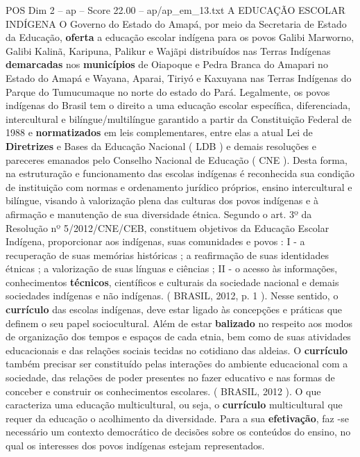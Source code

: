 \begin{textsample}{POS Dim 2 – ap – Score 22.00 – ap/ap\_em\_13.txt}  \label{ex:f2_pos_147}
A EDUCAÇÃO ESCOLAR INDÍGENA O Governo do Estado do Amapá, por meio da Secretaria de Estado da Educação, \textbf{oferta} a educação escolar indígena para os povos Galibi Marworno, Galibi Kalinã, Karipuna, Palikur e Wajãpi distribuídos nas Terras Indígenas \textbf{demarcadas} nos \textbf{municípios} de Oiapoque e Pedra Branca do Amapari no Estado do Amapá e Wayana, Aparai, Tiriyó e Kaxuyana nas Terras Indígenas do Parque do Tumucumaque no norte do estado do Pará.
Legalmente, os povos indígenas do Brasil tem o direito a uma educação escolar específica, diferenciada, intercultural e bilíngue/multilíngue garantido a partir da Constituição Federal de 1988 e \textbf{normatizados} em leis complementares, entre elas a atual Lei de \textbf{Diretrizes} e Bases da Educação Nacional ( LDB ) e demais resoluções e pareceres emanados pelo Conselho Nacional de Educação ( CNE ).
Desta forma, na estruturação e funcionamento das escolas indígenas é reconhecida sua condição de instituição com normas e ordenamento jurídico próprios, ensino intercultural e bilíngue, visando à valorização plena das culturas dos povos indígenas e à afirmação e manutenção de sua diversidade étnica.
Segundo o art. 3º da Resolução nº 5/2012/CNE/CEB, constituem objetivos da Educação Escolar Indígena, proporcionar aos indígenas, suas comunidades e povos : I - a recuperação de suas memórias históricas ; a reafirmação de suas identidades étnicas ; a valorização de suas línguas e ciências ; II - o acesso às informações, conhecimentos \textbf{técnicos}, científicos e culturais da sociedade nacional e demais sociedades indígenas e não indígenas. ( BRASIL, 2012, p. 1 ).
Nesse sentido, o \textbf{currículo} das escolas indígenas, deve estar ligado às concepções e práticas que definem o seu papel sociocultural.
Além de estar \textbf{balizado} no respeito aos modos de organização dos tempos e espaços de cada etnia, bem como de suas atividades educacionais e das relações sociais tecidas no cotidiano das aldeias.
O \textbf{currículo} também precisar ser constituído pelas interações do ambiente educacional com a sociedade, das relações de poder presentes no fazer educativo e nas formas de conceber e construir os conhecimentos escolares. ( BRASIL, 2012 ).
O que caracteriza uma educação multicultural, ou seja, o \textbf{currículo} multicultural que requer da educação o acolhimento da diversidade.
Para a sua \textbf{efetivação}, faz -se necessário um contexto democrático de decisões sobre os conteúdos do ensino, no qual os interesses dos povos indígenas estejam representados.

\end{textsample}
